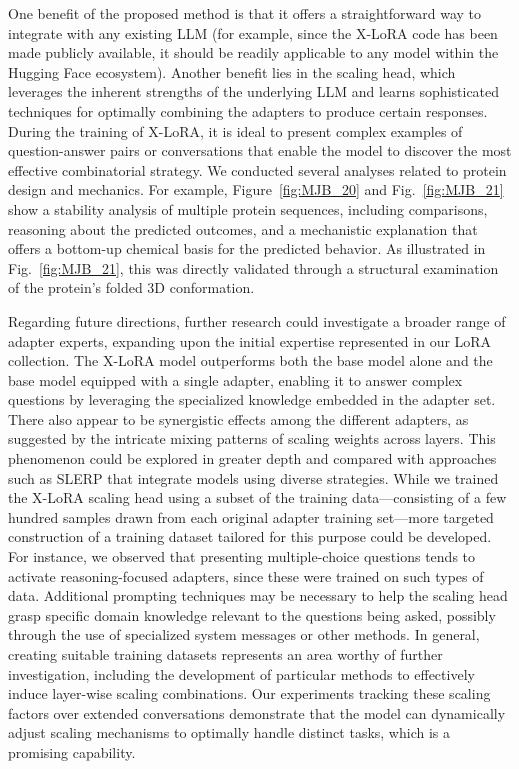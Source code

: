 One benefit of the proposed method is that it offers a straightforward way to integrate with any existing LLM (for example, since the X-LoRA code has been made publicly available, it should be readily applicable to any model within the Hugging Face ecosystem). Another benefit lies in the scaling head, which leverages the inherent strengths of the underlying LLM and learns sophisticated techniques for optimally combining the adapters to produce certain responses. During the training of X-LoRA, it is ideal to present complex examples of question-answer pairs or conversations that enable the model to discover the most effective combinatorial strategy. We conducted several analyses related to protein design and mechanics. For example, Figure~\ref{fig:MJB_20} and Fig.~\ref{fig:MJB_21} show a stability analysis of multiple protein sequences, including comparisons, reasoning about the predicted outcomes, and a mechanistic explanation that offers a bottom-up chemical basis for the predicted behavior. As illustrated in Fig.~\ref{fig:MJB_21}, this was directly validated through a structural examination of the protein’s folded 3D conformation. 

Regarding future directions, further research could investigate a broader range of adapter experts, expanding upon the initial expertise represented in our LoRA collection. The X-LoRA model outperforms both the base model alone and the base model equipped with a single adapter, enabling it to answer complex questions by leveraging the specialized knowledge embedded in the adapter set. There also appear to be synergistic effects among the different adapters, as suggested by the intricate mixing patterns of scaling weights across layers. This phenomenon could be explored in greater depth and compared with approaches such as SLERP that integrate models using diverse strategies. While we trained the X-LoRA scaling head using a subset of the training data—consisting of a few hundred samples drawn from each original adapter training set—more targeted construction of a training dataset tailored for this purpose could be developed. For instance, we observed that presenting multiple-choice questions tends to activate reasoning-focused adapters, since these were trained on such types of data. Additional prompting techniques may be necessary to help the scaling head grasp specific domain knowledge relevant to the questions being asked, possibly through the use of specialized system messages or other methods. In general, creating suitable training datasets represents an area worthy of further investigation, including the development of particular methods to effectively induce layer-wise scaling combinations. Our experiments tracking these scaling factors over extended conversations demonstrate that the model can dynamically adjust scaling mechanisms to optimally handle distinct tasks, which is a promising capability.

